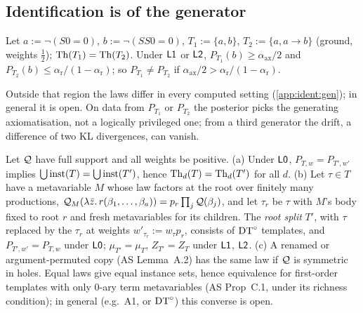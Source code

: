 \subsection{Identification is of the generator}\label{sec:ident:gen}

\begin{proposition}\label{prop:ident:sep}
Let $a:=\neg(S0=0)$, $b:=\neg(SS0=0)$, $T_1:=\{a,b\}$, $T_2:=\{a,a\to b\}$ (ground, weights $\frac12$); $\mathrm{Th}(T_1)=\mathrm{Th}(T_2)$. Under $\mathord{\mathsf{L1}}$ or $\mathord{\mathsf{L2}}$, $P_{T_1}(b)\ge\alpha_{\mathrm{ax}}/2$ and $P_{T_2}(b)\le\alpha_{\mathrm r}/(1-\alpha_{\mathrm r})$; so $P_{T_1}\ne P_{T_2}$ if $\alpha_{\mathrm{ax}}/2>\alpha_{\mathrm r}/(1-\alpha_{\mathrm r})$.
\end{proposition}

\noindent Outside that region the laws differ in every computed setting (\cref{app:ident:gen}); in general it is open. On data from $P_{T_1}$ or $P_{T_2}$ the posterior picks the generating axiomatisation, not a logically privileged one; from a third generator the drift, a difference of two KL divergences, can vanish.

\begin{proposition}\label{prop:ident:splits}
Let $\mathcal{Q}$ have full support and all weights be positive.
(a) Under $\mathord{\mathsf{L0}}$, $P_{T,w}=P_{T',w'}$ implies $\bigcup\mathrm{inst}(T)=\bigcup\mathrm{inst}(T')$, hence $\mathrm{Th}_d(T)=\mathrm{Th}_d(T')$ for all $d$.
(b) Let $\tau\in T$ have a metavariable $M$ whose law factors at the root over finitely many productions, $\mathcal{Q}_M(\lambda\bar z.\,r(\beta_1,\dots,\beta_a))=p_r\prod_j\mathcal{Q}(\beta_j)$, and let $\tau_r$ be $\tau$ with $M$'s body fixed to root $r$ and fresh metavariables for its children. The \emph{root split} $T'$, with $\tau$ replaced by the $\tau_r$ at weights $w'_{\tau_r}:=w_\tau p_r$, consists of $\mathrm{DT}^{\circ}$ templates, and $P_{T',w'}=P_{T,w}$ under $\mathord{\mathsf{L0}}$; $\mu_{T'}=\mu_T$, $Z_{T'}=Z_T$ under $\mathord{\mathsf{L1}}$, $\mathord{\mathsf{L2}}$.
(c) A renamed or argument-permuted copy (AS Lemma~A.2) has the same law if $\mathcal{Q}$ is symmetric in holes. Equal laws give equal instance sets, hence equivalence for first-order templates with only $0$-ary term metavariables (AS Prop~C.1, under its richness condition); in general (e.g.\ A1, or $\mathrm{DT}^{\circ}$) this converse is open.
\end{proposition}

